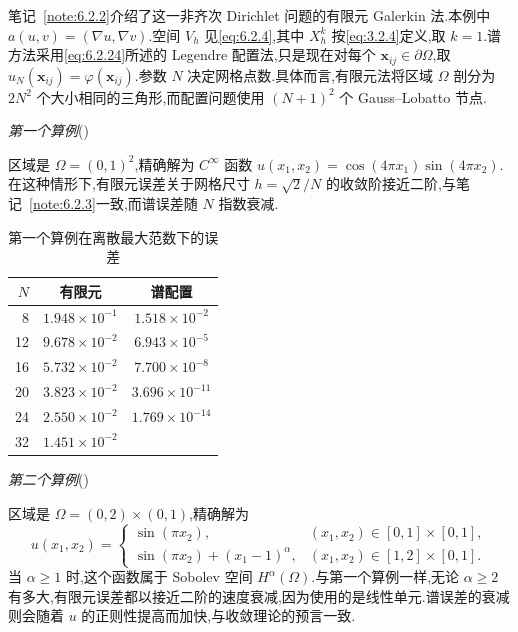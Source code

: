 笔记~\ref{note:6.2.2}介绍了这一非齐次 Dirichlet 问题的有限元 Galerkin 法.本例中 \(a(u,v)=(\nabla u,\nabla v)\).空间 \(V_h\) 见\eqref{eq:6.2.4},其中 \(X_h^k\) 按\eqref{eq:3.2.4}定义,取 \(k=1\).谱方法采用\eqref{eq:6.2.24}所述的 Legendre 配置法,只是现在对每个 \(\boldsymbol{x}_{ij}\in\partial\Omega\),取 \(u_N(\boldsymbol{x}_{ij})=\varphi(\boldsymbol{x}_{ij})\).参数 \(N\) 决定网格点数.具体而言,有限元法将区域 \(\Omega\) 剖分为 \(2N^2\) 个大小相同的三角形,而配置问题使用 \((N+1)^2\) 个 Gauss--Lobatto 节点.

\medskip
\noindent\textit{第一个算例}()

区域是 \(\Omega=(0,1)^2\),精确解为 \(C^\infty\) 函数 \(u(x_1,x_2)=\cos(4\pi x_1)\sin(4\pi x_2)\).在这种情形下,有限元误差关于网格尺寸 \(h=\sqrt2/N\) 的收敛阶接近二阶,与笔记~\ref{note:6.2.3}一致,而谱误差随 \(N\) 指数衰减.

\begin{table}[htbp]
  \centering
  \caption{第一个算例在离散最大范数下的误差}\label{tab:6.2.1}
  \begin{tabular}{rcc}
    \toprule
    \(N\)&有限元&谱配置\\
    \midrule
    8  & \(1.948\times10^{-1}\) & \(1.518\times10^{-2}\)\\
    12 & \(9.678\times10^{-2}\) & \(6.943\times10^{-5}\)\\
    16 & \(5.732\times10^{-2}\) & \(7.700\times10^{-8}\)\\
    20 & \(3.823\times10^{-2}\) & \(3.696\times10^{-11}\)\\
    24 & \(2.550\times10^{-2}\) & \(1.769\times10^{-14}\)\\
    32 & \(1.451\times10^{-2}\) & \\
    \bottomrule
  \end{tabular}
\end{table}

\medskip
\noindent\textit{第二个算例}()

区域是 \(\Omega=(0,2)\times(0,1)\),精确解为
\[
  u(x_1,x_2)=\begin{cases}
    \sin(\pi x_2),&(x_1,x_2)\in[0,1]\times[0,1],\\
    \sin(\pi x_2)+(x_1-1)^\alpha,&(x_1,x_2)\in[1,2]\times[0,1].
  \end{cases}
\]
当 \(\alpha\ge1\) 时,这个函数属于 Sobolev 空间 \(H^\alpha(\Omega)\).与第一个算例一样,无论 \(\alpha\ge2\) 有多大,有限元误差都以接近二阶的速度衰减,因为使用的是线性单元.谱误差的衰减则会随着 \(u\) 的正则性提高而加快,与收敛理论的预言一致.


